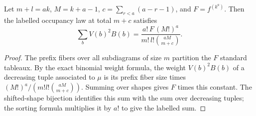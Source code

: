 \begin{lemma}
\label{lem:prefix-normalizer-count}
\leanok
Let $m+l=ak$, $M=k+a-1$, $c=\sum_{r<a}(a-r-1)$, and
$F=f^{(k^a)}$. Then the labelled occupancy law at total $m+c$ satisfies
\[
 \sum_b V(b)^2 B(b)=
 \frac{a!\,F\,(M!)^a}{m!\,l!\binom{aM}{m+c}}.
\]
\end{lemma}
\begin{proof}
The prefix fibers over all subdiagrams of size $m$ partition the $F$
standard tableaux. By the exact binomial weight formula, the weight
$V(b)^2B(b)$ of a decreasing tuple associated to $\mu$ is its prefix
fiber size times $(M!)^a/(m!l!\binom{aM}{m+c})$.
Summing over shapes gives $F$ times this constant. The shifted-shape
bijection identifies this sum with the sum over decreasing tuples;
the sorting formula multiplies it by $a!$ to give the labelled sum.
\end{proof}

